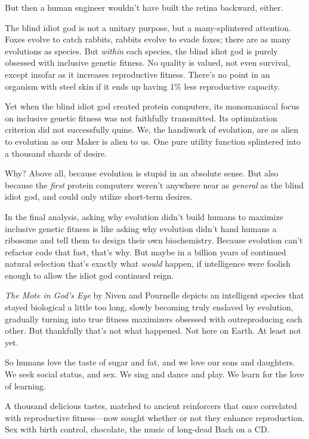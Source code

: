  But then a human engineer wouldn't have built the
retina backward, either.


 The blind idiot god is not a unitary purpose, but a
many-splintered attention. Foxes evolve to catch rabbits, rabbits
evolve to evade foxes; there are as many evolutions as species. But
\textit{within} each species, the blind idiot god is purely obsessed
with inclusive genetic fitness. No quality is valued, not even
survival, except insofar as it increases reproductive fitness.
There's no point in an organism with steel skin if it
ends up having 1\% less reproductive capacity.


 Yet when the blind idiot god created protein computers, its
monomaniacal focus on inclusive genetic fitness was not faithfully
transmitted. Its optimization criterion did not successfully quine. We,
the handiwork of evolution, are as alien to evolution as our Maker is
alien to us. One pure utility function splintered into a thousand
shards of desire.


 Why? Above all, because evolution is stupid in an absolute sense.
But also because the \textit{first} protein computers
weren't anywhere near as \textit{general} as the blind
idiot god, and could only utilize short-term desires.


 In the final analysis, asking why evolution didn't
build humans to maximize inclusive genetic fitness is like asking why
evolution didn't hand humans a ribosome and tell them
to design their own biochemistry. Because evolution
can't refactor code that fast, that's
why. But maybe in a billion years of continued natural selection
that's exactly what \textit{would} happen, if
intelligence were foolish enough to allow the idiot god continued
reign.


 \textit{The Mote in God's Eye} by Niven and
Pournelle depicts an intelligent species that stayed biological a
little too long, slowly becoming truly enslaved by evolution, gradually
turning into true fitness maximizers obsessed with outreproducing each
other. But thankfully that's not what happened. Not
here on Earth. At least not yet.


 So humans love the taste of sugar and fat, and we love our sons
and daughters. We seek social status, and sex. We sing and dance and
play. We learn for the love of learning.


 A thousand delicious tastes, matched to ancient reinforcers that
once correlated with reproductive fitness---now sought whether or not
they enhance reproduction. Sex with birth control, chocolate, the music
of long-dead Bach on a CD.


